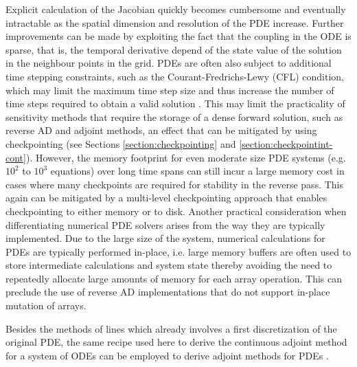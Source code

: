 Explicit calculation of the Jacobian quickly becomes cumbersome and eventually intractable as the spatial dimension and resolution of the PDE increase.
Further improvements can be made by exploiting the fact that the coupling in the ODE is sparse, that is, the temporal derivative depend of the state value of the solution in the neighbour points in the grid.
PDEs are often also subject to additional time stepping constraints, such as the Courant-Fredrichs-Lewy (CFL) condition, which may limit the maximum time step size and thus increase the number of time steps required to obtain a valid solution \cite{courantPartialDifferenceEquations1967}. 
This may limit the practicality of sensitivity methods that require the storage of a dense forward solution, such as reverse AD and adjoint methods, an effect that can be mitigated by using checkpointing (see Sections \ref{section:checkpointing} and \ref{section:checkpointint-cont}).
However, the memory footprint for even moderate size PDE systems (e.g. $10^2$ to $10^3$ equations) over long time spans can still incur a large memory cost in cases where many checkpoints are required for stability in the reverse pass. 
This again can be mitigated by a multi-level checkpointing approach that enables checkpointing to either memory or to disk.
Another practical consideration when differentiating numerical PDE solvers arises from the way they are typically implemented. 
Due to the large size of the system, numerical calculations for PDEs are typically performed in-place, i.e. large memory buffers are often used to store intermediate calculations and system state thereby avoiding the need to repeatedly allocate large amounts of memory for each array operation. 
This can preclude the use of reverse AD implementations that do not support in-place mutation of arrays.

Besides the methods of lines which already involves a first discretization of the original PDE, the same recipe used here to derive the continuous adjoint method for a system of ODEs can be employed to derive adjoint methods for PDEs \cite{Giles_Pierce_2000}. 


